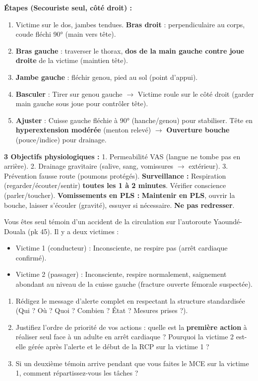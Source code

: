 \documentclass[11pt]{article}
\newcommand{\cle}[1]{{\popxbold\color{popdark}#1}}
\begin{document}
\begin{aretenir}
\textbf{Étapes (Secouriste seul, côté droit) :}
\begin{enumerate}
    \item Victime sur le dos, jambes tendues. \textbf{Bras droit} : perpendiculaire au corps, coude fléchi 90° (main vers tête).
    \item \textbf{Bras gauche} : traverser le thorax, \textbf{dos de la main gauche contre joue droite} de la victime (maintien tête).
    \item \textbf{Jambe gauche} : fléchir genou, pied au sol (point d'appui).
    \item \textbf{Basculer} : Tirer sur genou gauche $\rightarrow$ Victime roule sur le côté droit (garder main gauche sous joue pour contrôler tête).
    \item \textbf{Ajuster} : Cuisse gauche fléchie à 90° (hanche/genou) pour stabiliser. Tête en \textbf{hyperextension modérée} (menton relevé) $\rightarrow$ \textbf{Ouverture bouche} (pouce/indice) pour drainage.
\end{enumerate}
\textbf{3 Objectifs physiologiques :} 1. \cle{Permeabilité VAS} (langue ne tombe pas en arrière). 2. \cle{Drainage gravitaire} (salive, sang, vomissures $\rightarrow$ extérieur). 3. \cle{Prévention fausse route} (poumons protégés).
\textbf{Surveillance :} Respiration (regarder/écouter/sentir) \textbf{toutes les 1 à 2 minutes}. Vérifier conscience (parler/toucher).
\textbf{Vomissements en PLS :} \textbf{Maintenir en PLS}, ouvrir la bouche, laisser s'écouler (gravité), essuyer si nécessaire. \textbf{Ne pas redresser}.
\end{aretenir}

\begin{exercice}
Vous êtes seul témoin d'un accident de la circulation sur l'autoroute Yaoundé-Douala (pk 45). Il y a deux victimes :
\begin{itemize}
    \item Victime 1 (conducteur) : Inconsciente, ne respire pas (arrêt cardiaque confirmé).
    \item Victime 2 (passager) : Inconsciente, respire normalement, saignement abondant au niveau de la cuisse gauche (fracture ouverte fémorale suspectée).
\end{itemize}
\begin{enumerate}
    \item Rédigez le message d'alerte complet en respectant la structure standardisée (Qui ? Où ? Quoi ? Combien ? État ? Mesures prises ?).
    \item Justifiez l'ordre de priorité de vos actions : quelle est la \textbf{première action} à réaliser seul face à un adulte en arrêt cardiaque ? Pourquoi la victime 2 est-elle gérée après l'alerte et le début de la RCP sur la victime 1 ?
    \item Si un deuxième témoin arrive pendant que vous faites le MCE sur la victime 1, comment répartissez-vous les tâches ?
\end{enumerate}
\end{exercice}
\end{document}
